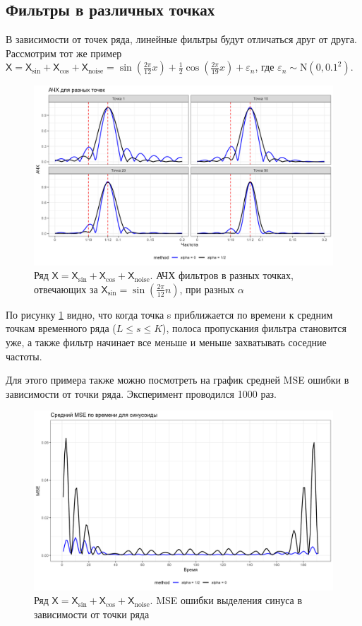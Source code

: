 \documentclass[a4paper, 11pt]{article}
\newcommand{\TS}{\mathsf{X}}
\begin{document}
\subsection{Фильтры в различных точках}
В зависимости от точек ряда, линейные фильтры будут отличаться друг от друга. Рассмотрим тот же пример $\TS = \TS_{\sin} + \TS_{\cos} + \TS_{\mathrm{noise}} =
\sin\left(\frac{2\pi}{12}x\right) +
 \frac{1}{2}\cos\left(\frac{2\pi}{19}x\right)+
  \varepsilon_n$, 
  где $\varepsilon_n \sim \mathrm N(0, 0.1^2)$.
\begin{figure}[H]
	\centering
	\includegraphics[width=1\textwidth]{img/afc_4_points.png}
	\caption{Ряд $\TS = \TS_{\sin} + \TS_{\cos}+ \TS_{\mathrm{noise}}$. АЧХ фильтров в разных точках, отвечающих за $\TS_{\sin} = \sin\left(\frac{2\pi}{12} n \right)$, при разных $\alpha$}
	\label{fig:filter_point_depends}
\end{figure}

По рисунку \ref{fig:filter_point_depends} видно, что когда точка s приближается по времени к средним точкам временного ряда ($L \leq s \leq K$), полоса пропускания фильтра становится уже, а также фильтр начинает все меньше и меньше захватывать соседние частоты. 

Для этого примера также можно посмотреть на график средней MSE ошибки в зависимости от точки ряда. Эксперимент проводился 1000 раз.
\begin{figure}[H]
	\centering
	\includegraphics[width=1\textwidth]{img/mse_y1_time.png}
	\caption{Ряд $\TS = \TS_{\sin} + \TS_{\cos}+ \TS_{\mathrm{noise}}$. MSE ошибки выделения синуса в зависимости от точки ряда}
	\label{fig:mse_filter_point_depends}
\end{figure}
\end{document}
